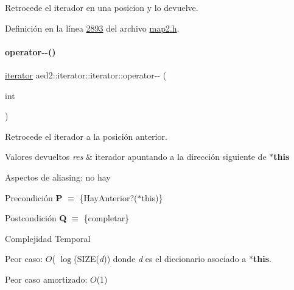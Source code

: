 Retrocede el iterador en una posicion y lo devuelve. 

Definición en la línea \hyperlink{map2_8h_source_l02893}{2893} del archivo \hyperlink{map2_8h_source}{map2.\+h}.

\mbox{\label{classaed2_1_1iterator_1_1iterator_a6bd61026c75767d0d41e45229144e9d0_a6bd61026c75767d0d41e45229144e9d0}} 
\paragraph{\texorpdfstring{operator-\/-\/()}{operator--()}\hspace{0.1cm}{\footnotesize\ttfamily [2/2]}}
{\footnotesize\ttfamily \hyperlink{classaed2_1_1iterator_1_1iterator}{iterator} aed2\+::iterator\+::iterator\+::operator-\/-\/ (\begin{DoxyParamCaption}\item[{int}]{ }\end{DoxyParamCaption})\hspace{0.3cm}{\ttfamily [inline]}}



Retrocede el iterador a la posición anterior. 


\begin{DoxyRetVals}{Valores devueltos}
{\em res} & iterador apuntando a la dirección siguiente de {\bfseries $\ast$this}\\
\hline
\end{DoxyRetVals}
\begin{DoxyParagraph}{Aspectos de aliasing\+:}
no hay
\end{DoxyParagraph}
\begin{DoxyPrecond}{Precondición}
{\bfseries P} $\equiv$ \{Hay\+Anterior?($\ast$this)\} 
\end{DoxyPrecond}
\begin{DoxyPostcond}{Postcondición}
{\bfseries Q} $\equiv$ \{completar\}
\end{DoxyPostcond}

\begin{DoxyDescription}
\item[Complejidad Temporal]
\begin{DoxyItemize}
\item Peor caso\+: $O$( $\log$(S\+I\+ZE({\itshape d})) donde {\itshape d} es el diccionario asociado a {\bfseries $\ast$this}.
\item Peor caso amortizado\+: $O$(1) 
\end{DoxyItemize}
\end{DoxyDescription}

